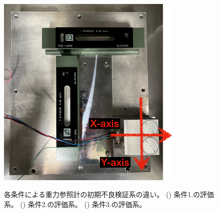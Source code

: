 \documentclass[../../main.tex]{subfiles}
\begin{document}
\begin{figure}[H]
\begin{minipage}[b]{0.42\columnwidth}
        \subcaption{}
        \label{fig:evaluation_kyoto2}
    \end{minipage}
    \begin{minipage}[b]{0.455\columnwidth}
        \centering
        \includegraphics[width=0.8\textwidth]{tiltsensor/evalu_kyoto3.pdf}
        \subcaption{}
        \label{fig:evaluation_kyoto3}
    \end{minipage}
    \caption{各条件による重力参照計の初期不良検証系の違い。
             () 条件1.の評価系。
             () 条件2.の評価系。
             () 条件3.の評価系。}
    \label{fig:evaluation_kyoto}
\end{figure}
\end{document}
